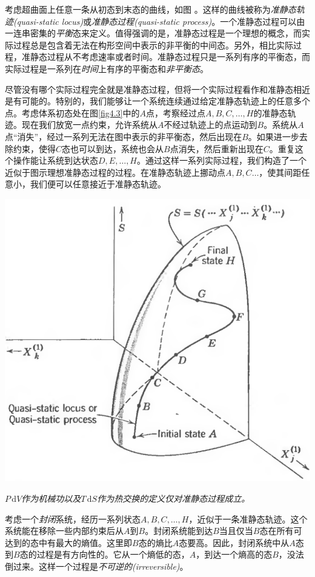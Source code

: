 考虑超曲面上任意一条从初态到末态的曲线，如图 。这样的曲线被称为{\it 准静态轨迹(quasi-static locus)}或{\it 准静态过程(quasi-static process)}。一个准静态过程可以由一连串密集的{\it 平衡}态来定义。值得强调的是，准静态过程是一个理想的概念，而实际过程总是包含着无法在构形空间中表示的非平衡的中间态。另外，相比实际过程，准静态过程从不考虑速率或者时间。准静态过程只是一系列有序的平衡态，而实际过程是一系列在{\it 时间}上有序的平衡态和{\it 非平衡态}。

尽管没有哪个实际过程完全就是准静态过程，但将一个实际过程看作和准静态相近是有可能的。特别的，我们能够让一个系统连续通过给定准静态轨迹上的任意多个点。考虑体系初态处在图\ref{fig4.3}中的$A$点，考察经过点$A, B, C,\dots ,H$的准静态轨迹。现在我们放宽一点约束，允许系统从$A$不经过轨迹上的点运动到$B$。系统从$A$点“消失”，经过一系列无法在图中表示的非平衡态，然后出现在$B$。如果进一步去除约束，使得$C$态也可以到达，系统也会从$B$点消失，然后重新出现在$C$。重复这个操作能让系统到达状态$D,E,\dots ,H$。通过这样一系列实际过程，我们构造了一个近似于图示理想准静态过程的过程。在准静态轨迹上挪动点$A,B,C\dots$，使其间距任意小，我们便可以任意接近于准静态轨迹。

{
	\includegraphics[width=.8\textwidth]{Pictures/fig4.3.png}
	\label{fig4.3}
}

{\it $P\,\mathrm dV$作为机械功以及$T\,\mathrm dS$作为热交换的定义仅对准静态过程成立。}

考虑一个{\it 封闭}系统，经历一系列状态$A,B,C,\dots ,H$，近似于一条准静态轨迹。这个系统能在移除一些内部约束后从$A$到$B$。封闭系统能到达$B$当且仅当$B$态在所有可达到的态中有最大的熵值。这里即$B$态的熵比$A$态要高。因此，封闭系统中从$A$态到$B$态的过程是有方向性的。它从一个熵低的态，$A$，到达一个熵高的态$B$，没法倒过来。这样一个过程是{\it 不可逆的(irreversible)}。

